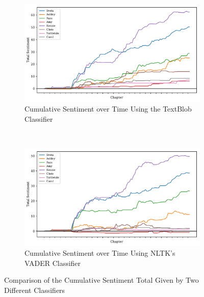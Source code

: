 \documentclass[11pt]{article}
\begin{document}
\begin{figure}[H]
\centering
\begin{subfigure}[t]{0.485\textwidth}
\centering
\includegraphics[width=\textwidth]{Full Graphs/total_sent_scores.pdf}
\caption{Cumulative Sentiment over Time Using the TextBlob Classifier}
\label{sent_compare_1}
\end{subfigure}
~
\begin{subfigure}[t]{0.485\textwidth}
\centering
\includegraphics[width=\textwidth]{Full Graphs v2/total_sent_scores.pdf}
\caption{Cumulative Sentiment over Time Using NLTK's VADER Classifier}
\label{sent_compare_2}
\end{subfigure}
\caption{Comparison of the Cumulative Sentiment Total Given by Two Different Classifiers}
\label{sent_anal_comparison}
\end{figure}
\end{document}
